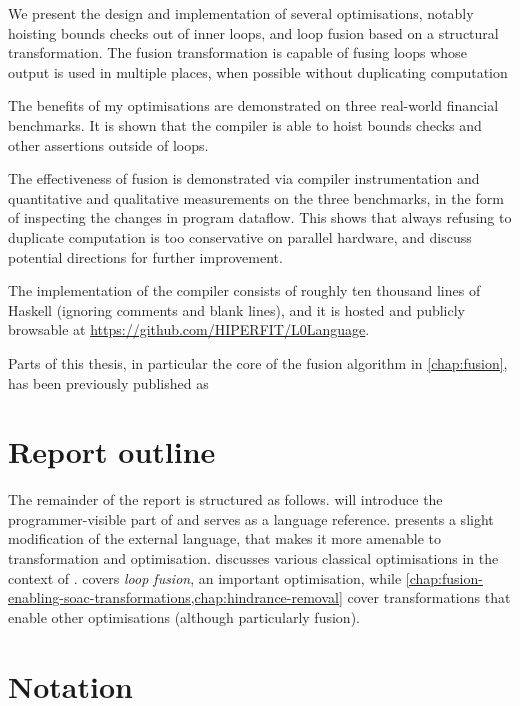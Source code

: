 We present the design and implementation of several optimisations,
notably hoisting bounds checks out of inner loops, and loop fusion
based on a structural transformation.  The fusion transformation is
capable of fusing loops whose output is used in multiple places, when
possible without duplicating computation

The benefits of my optimisations are demonstrated on three real-world
financial benchmarks.  It is shown that the compiler is able to hoist
bounds checks and other assertions outside of loops.

The effectiveness of fusion is demonstrated via compiler
instrumentation and quantitative and qualitative measurements on the
three benchmarks, in the form of inspecting the changes in program
dataflow.  This shows that always refusing to duplicate computation is
too conservative on parallel hardware, and discuss potential
directions for further improvement.

The implementation of the \LO{} compiler consists of roughly ten
thousand lines of Haskell (ignoring comments and blank lines), and it
is hosted and publicly browsable at
\url{https://github.com/HIPERFIT/L0Language}.

Parts of this thesis, in particular the core of the fusion algorithm
in \cref{chap:fusion}, has been previously published as

\begin{quote}
\end{quote}

\section{Report outline}

The remainder of the report is structured as follows.
 will introduce the
programmer-visible part of \LO{} and serves as a language reference.
 presents a slight modification of the external
language, that makes it more amenable to transformation and
optimisation.   discusses various
classical optimisations in the context of \LO{}.  
covers \textit{loop fusion}, an important optimisation, while
\cref{chap:fusion-enabling-soac-transformations,chap:hindrance-removal}
cover transformations that enable other optimisations (although
particularly fusion).

\section{Notation}

